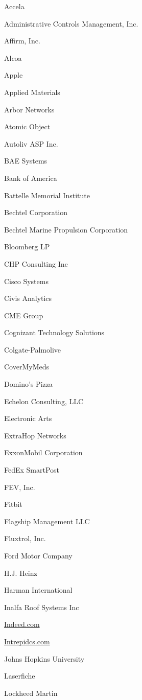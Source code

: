\documentclass[twoside]{article}
\begin{document}
\begin{center}
\begin{multicols}{5}
\begin{FlushLeft}
\begin{compactitem}
        \item Accela
\item Administrative Controls Management, Inc.
\item Affirm, Inc.
\item Alcoa
\item Apple
\item Applied Materials
\item Arbor Networks
\item Atomic Object
\item Autoliv ASP Inc.
\item BAE Systems
\item Bank of America
\item Battelle Memorial Institute
\item Bechtel Corporation
\item Bechtel Marine Propulsion Corporation
\item Bloomberg LP
\item CHP Consulting Inc
\item Cisco Systems
\item Civis Analytics
\item CME Group
\item Cognizant Technology Solutions
\item Colgate-Palmolive
\item CoverMyMeds
\item Domino's Pizza
\item Echelon Consulting, LLC
\item Electronic Arts
\item ExtraHop Networks
\item ExxonMobil Corporation
\item FedEx SmartPost
\item FEV, Inc.
\item Fitbit
\item Flagship Management LLC
\item Fluxtrol, Inc.
\item Ford Motor Company
\item H.J. Heinz
\item Harman International
\item Inalfa Roof Systems Inc
\item \url{Indeed.com}
\item \url{Intrepidcs.com}
\item Johns Hopkins University
\item Laserfiche
\item Lockheed Martin

\end{compactitem}
\end{FlushLeft}
\end{multicols}
\end{center}
\end{document}

